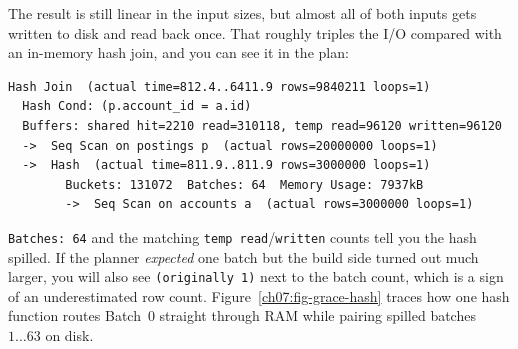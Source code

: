 The result is still linear in the input sizes, but almost all of both inputs gets written to disk and read back once. That roughly triples the I/O compared with an in-memory hash join, and you can see it in the plan:

\begin{lstlisting}[language=Plain]
Hash Join  (actual time=812.4..6411.9 rows=9840211 loops=1)
  Hash Cond: (p.account_id = a.id)
  Buffers: shared hit=2210 read=310118, temp read=96120 written=96120
  ->  Seq Scan on postings p  (actual rows=20000000 loops=1)
  ->  Hash  (actual time=811.9..811.9 rows=3000000 loops=1)
        Buckets: 131072  Batches: 64  Memory Usage: 7937kB
        ->  Seq Scan on accounts a  (actual rows=3000000 loops=1)
\end{lstlisting}

\texttt{Batches: 64} and the matching \texttt{temp read}/\texttt{written} counts tell you the hash spilled. If the planner \emph{expected} one batch but the build side turned out much larger, you will also see \texttt{(originally 1)} next to the batch count, which is a sign of an underestimated row count. Figure~\ref{ch07:fig-grace-hash} traces how one hash function routes Batch~0 straight through RAM while pairing spilled batches $1 \dots 63$ on disk.

